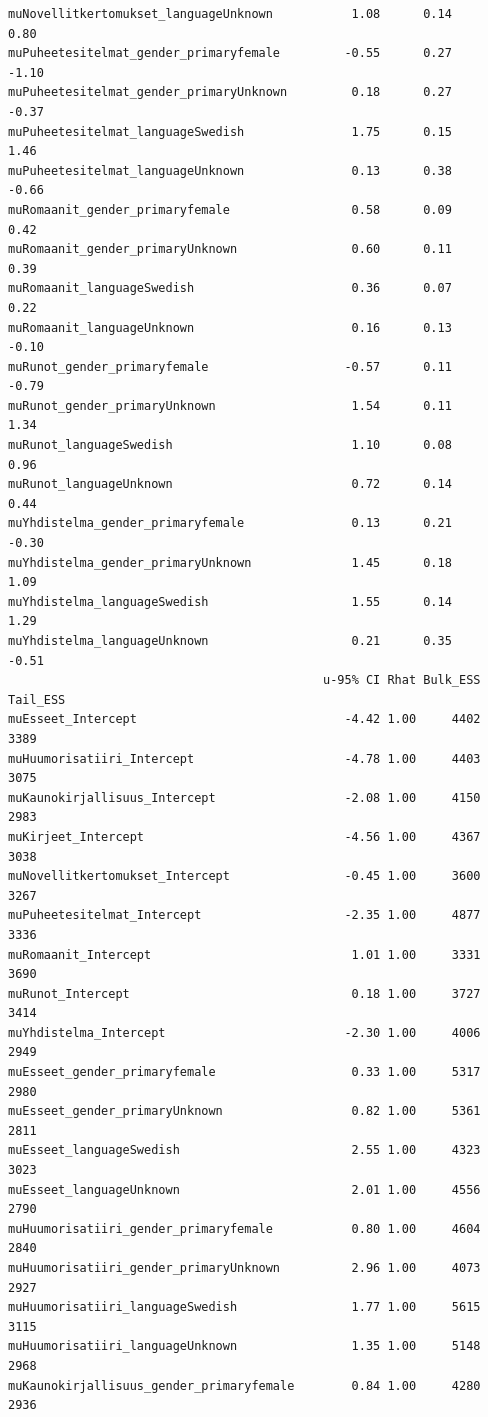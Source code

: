 \documentclass[
  letterpaper,
  DIV=11,
  numbers=noendperiod]{scrartcl}
\begin{document}
\begin{verbatim}
muNovellitkertomukset_languageUnknown           1.08      0.14     0.80
muPuheetesitelmat_gender_primaryfemale         -0.55      0.27    -1.10
muPuheetesitelmat_gender_primaryUnknown         0.18      0.27    -0.37
muPuheetesitelmat_languageSwedish               1.75      0.15     1.46
muPuheetesitelmat_languageUnknown               0.13      0.38    -0.66
muRomaanit_gender_primaryfemale                 0.58      0.09     0.42
muRomaanit_gender_primaryUnknown                0.60      0.11     0.39
muRomaanit_languageSwedish                      0.36      0.07     0.22
muRomaanit_languageUnknown                      0.16      0.13    -0.10
muRunot_gender_primaryfemale                   -0.57      0.11    -0.79
muRunot_gender_primaryUnknown                   1.54      0.11     1.34
muRunot_languageSwedish                         1.10      0.08     0.96
muRunot_languageUnknown                         0.72      0.14     0.44
muYhdistelma_gender_primaryfemale               0.13      0.21    -0.30
muYhdistelma_gender_primaryUnknown              1.45      0.18     1.09
muYhdistelma_languageSwedish                    1.55      0.14     1.29
muYhdistelma_languageUnknown                    0.21      0.35    -0.51
                                            u-95% CI Rhat Bulk_ESS Tail_ESS
muEsseet_Intercept                             -4.42 1.00     4402     3389
muHuumorisatiiri_Intercept                     -4.78 1.00     4403     3075
muKaunokirjallisuus_Intercept                  -2.08 1.00     4150     2983
muKirjeet_Intercept                            -4.56 1.00     4367     3038
muNovellitkertomukset_Intercept                -0.45 1.00     3600     3267
muPuheetesitelmat_Intercept                    -2.35 1.00     4877     3336
muRomaanit_Intercept                            1.01 1.00     3331     3690
muRunot_Intercept                               0.18 1.00     3727     3414
muYhdistelma_Intercept                         -2.30 1.00     4006     2949
muEsseet_gender_primaryfemale                   0.33 1.00     5317     2980
muEsseet_gender_primaryUnknown                  0.82 1.00     5361     2811
muEsseet_languageSwedish                        2.55 1.00     4323     3023
muEsseet_languageUnknown                        2.01 1.00     4556     2790
muHuumorisatiiri_gender_primaryfemale           0.80 1.00     4604     2840
muHuumorisatiiri_gender_primaryUnknown          2.96 1.00     4073     2927
muHuumorisatiiri_languageSwedish                1.77 1.00     5615     3115
muHuumorisatiiri_languageUnknown                1.35 1.00     5148     2968
muKaunokirjallisuus_gender_primaryfemale        0.84 1.00     4280     2936

\end{verbatim}
\end{document}
